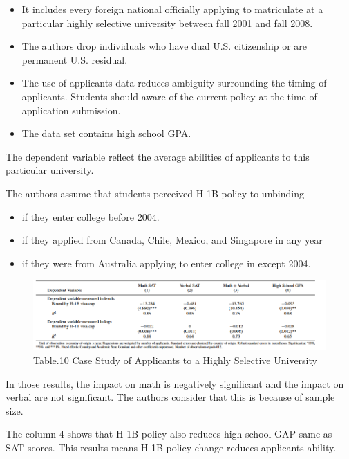 \documentclass[../root]{subfiles}
\begin{document}
    \begin{itemize}
        \item It includes every foreign national officially applying to matriculate at a particular highly selective university between fall 2001 and fall 2008.
        \item The authors drop individuals who have dual U.S. citizenship or are permanent U.S.  residual.
        \item The use of applicants data reduces ambiguity surrounding the timing of applicants.  Students should aware of the current policy at the time of application submission.
        \item The data set contains high school GPA.
    \end{itemize}
    The dependent variable reflect the average abilities of applicants to this particular university.
    
    The authors assume that students perceived H-1B policy to unbinding 
    \begin{itemize}
        \item if they enter college before 2004.
        \item if they applied from Canada, Chile, Mexico, and Singapore in any year
        \item if they were from Australia applying to enter college in except 2004.
    \end{itemize}
      
      \begin{figure}
        \centering
        \includegraphics[width = \linewidth]{1016sugiyama/Table_10.png}
        \caption{Table.10 Case Study of Applicants to a Highly Selective University}
        \label{fig:my_label}
    \end{figure}
    
    In those results, the impact on math is negatively significant and the impact on verbal are not significant. The authors consider that this is because of sample size. 
    
    The column 4 shows that H-1B policy also reduces high school GAP same as SAT scores. This results means H-1B policy change reduces applicants ability.
    
\end{document}

